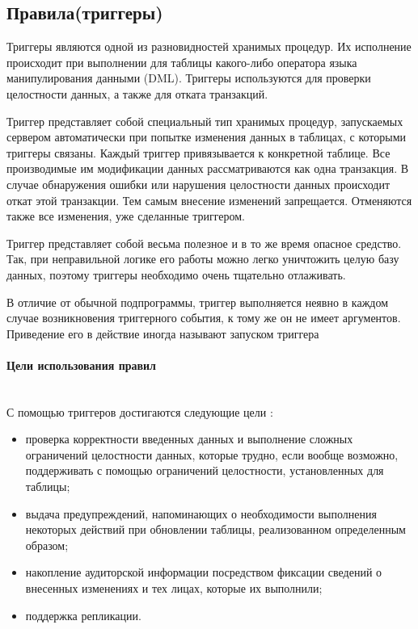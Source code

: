 \subsection{Правила(триггеры)}
Триггеры являются одной из разновидностей хранимых процедур. Их исполнение происходит при выполнении для таблицы какого-либо оператора языка манипулирования данными (DML). Триггеры используются для проверки целостности данных, а также для отката транзакций.

Триггер представляет собой специальный тип хранимых процедур, запускаемых сервером автоматически при попытке изменения данных в таблицах, с которыми триггеры связаны. Каждый триггер привязывается к конкретной таблице. Все производимые им модификации данных рассматриваются как одна транзакция. В случае обнаружения ошибки или нарушения целостности данных происходит откат этой транзакции. Тем самым внесение изменений запрещается. Отменяются также все изменения, уже сделанные триггером.

Триггер представляет собой весьма полезное и в то же время опасное средство. Так, при неправильной логике его работы можно легко уничтожить целую базу данных, поэтому триггеры необходимо очень тщательно отлаживать.

В отличие от обычной подпрограммы, триггер выполняется неявно в каждом случае возникновения триггерного события, к тому же он не имеет аргументов. Приведение его в действие иногда называют запуском триггера \autocite{IntuitTrigg}

\paragraph{Цели использования правил} ~\\

С помощью триггеров достигаются следующие цели \autocite{IntuitTrigg}:
\begin{itemize}
\item проверка корректности введенных данных и выполнение сложных ограничений целостности данных, которые трудно, если вообще возможно, поддерживать с помощью ограничений целостности, установленных для таблицы;
\item выдача предупреждений, напоминающих о необходимости выполнения некоторых действий при обновлении таблицы, реализованном определенным образом;
\item накопление аудиторской информации посредством фиксации сведений о внесенных изменениях и тех лицах, которые их выполнили;
\item поддержка репликации.
\end{itemize}
